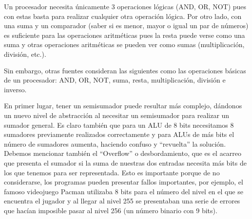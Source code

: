 \documentclass[answers]{exam}
\begin{document}
\begin{questions}
  \begin{solution}
    Un procesador necesita únicamente 3 operaciones lógicas (AND, OR, NOT)
    pues con estas basta para realizar cualquier otra operación lógica. Por otro
    lado, con una suma y un comparador (saber si es menor, mayor o igual un par
    de números) es suficiente para las operaciones aritméticas pues la resta
    puede verse como una suma y otras operaciones aritméticas se pueden ver como
    sumas (multiplicación, división, etc.).

    Sin embargo, otras fuentes consideran las siguientes como las operaciones
    básicas de un procesador: AND, OR, NOT, suma, resta, multiplicación,
    división e inverso.
  \end{solution}

  \begin{solution}
    En primer lugar, tener un semisumador puede resultar más complejo,
    dándonos un nuevo nivel de abstracción al necesitar un semisumador para
    realizar un sumador general. Es claro también que para un ALU de 8 bits
    necesitamos 8 sumadores previamente realizados correctamente y para ALUs de
    más bits el número de sumadores aumenta, haciendo confuso y ``revuelta'' la
    solución. Debemos mencionar también el ``Overflow'' o desbordamiento, que es
    el acarreo que presenta el sumador si la suma de nuestras dos entradas
    necesita más bits de los que tenemos para ser representada. Esto es
    importante porque de no considerarse, los programas pueden presentar fallos
    importantes, por ejemplo, el famoso videojuego Pacman utilizaba 8 bits para
    el número del nivel en el que se encuentra el jugador y al llegar al nivel
    255 se presentaban una serie de errores que hacían imposible pasar al nivel
    256 (un número binario con 9 bits).
\end{solution}
\end{questions}
\end{document}
